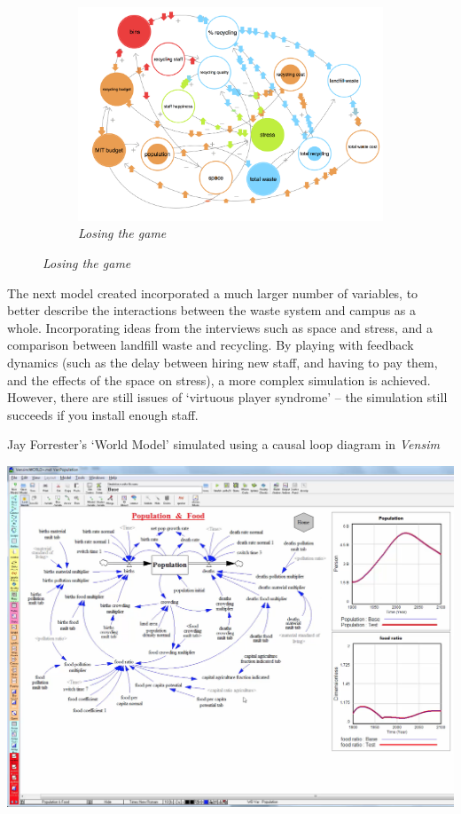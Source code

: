 \documentclass[nofonts,nols,justified,nobib]{tufte-book}
\begin{document}
\begin{figure}
\begin{subfigure}{.3\textwidth}
  \centering
  \includegraphics[width=1\linewidth]{img/3/loopy/big-lose.png}
  \caption{\textit{Losing the game}}
  \label{small:lose}
\end{subfigure}%
\end{figure}
\vspace{0.8cm}

The next model created incorporated a much larger number of variables, to better describe the interactions between the waste system and campus as a whole. Incorporating ideas from the interviews such as space and stress, and a comparison between landfill waste and recycling. By playing with feedback dynamics (such as the delay between hiring new staff, and having to pay them, and the effects of the space on stress), a more complex simulation is achieved. However, there are still issues of `virtuous player syndrome' -- the simulation still succeeds if you install enough staff.

\begin{marginfigure}
  \caption{Jay Forrester's `World Model' simulated using a causal loop diagram in \emph{Vensim} \cite{noauthor_vensim_nodate}}
  \includegraphics[width=1\linewidth]{img/3/vensim.png}
  \label{contamination}
\end{marginfigure}
\end{document}
